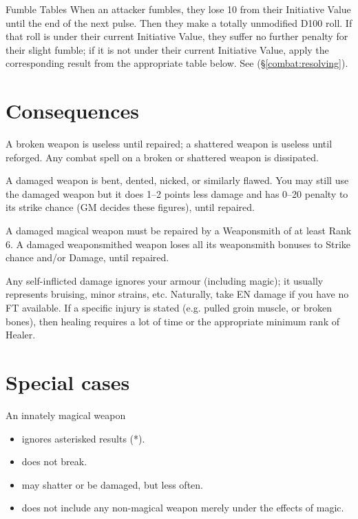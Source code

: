 \begin{Chapter}{Fumble Tables}
\label{table:fumble}
When an attacker fumbles, they lose 10 from their Initiative Value
until the end of the next pulse.  Then they make a totally unmodified
D100 roll.  If that roll is under their current Initiative Value, they
suffer no further penalty for their slight fumble; if it is not under
their current Initiative Value, apply the corresponding result from
the appropriate table below. See (\S\ref{combat:resolving}).

\section{Consequences}

A broken weapon is useless until repaired; a shattered weapon is
useless until reforged. Any combat spell on a broken or shattered
weapon is dissipated.

A damaged weapon is bent, dented, nicked, or similarly flawed.  You
may still use the damaged weapon but it does 1–2 points less damage
and has 0–20 penalty to its strike chance (GM decides these figures),
until repaired.

A damaged magical weapon must be repaired by a Weaponsmith of at least
Rank 6.  A damaged weaponsmithed weapon loses all its weaponsmith
bonuses to Strike chance and/or Damage, until repaired.

Any self-inflicted damage ignores your armour (including magic); it
usually represents bruising, minor strains, etc.  Naturally, take EN
damage if you have no FT available.  If a specific injury is stated
(e.g. pulled groin muscle, or broken bones), then healing requires a
lot of time or the appropriate minimum rank of Healer.

\section{Special cases}

An innately magical weapon  

\begin{itemize}
\item ignores asterisked results (*).  
\item does not break.  
\item may shatter or be damaged, but less often.  
\item does not include any non-magical weapon merely under the effects of magic. 
\end{itemize}


\end{Chapter}
